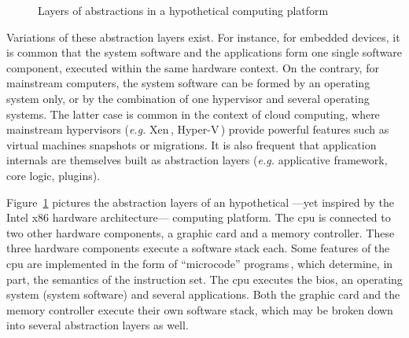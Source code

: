 \begin{figure}

  \caption{Layers of abstractions in a hypothetical computing platform}
  \label{fig:intro:layers}
\end{figure}

Variations of these abstraction layers exist.
%
For instance, for embedded devices, it is common that the system software and
the applications form one single software component, executed within the same
hardware context.
%
On the contrary, for mainstream computers, the system software can be formed by
an operating system only, or by the combination of one hypervisor and several
operating systems.
%
The latter case is common in the context of cloud computing, where mainstream
hypervisors (\emph{e.g.} Xen\,\cite{barham2003xen},
Hyper-V\,\cite{velte2009hyperv}) provide powerful features such as virtual
machines snapshots or migrations.
%
It is also frequent that application internals are themselves built as
abstraction layers (\emph{e.g.} applicative framework, core logic, plugins).

Figure~\ref{fig:intro:layers} pictures the abstraction layers of an hypothetical
---yet inspired by the Intel x86 hardware architecture--- computing platform.
%
The \ac{cpu} is connected to two other hardware components, a graphic card and a
memory controller.
%
These three hardware components execute a software stack each.
%
Some features of the \ac{cpu} are implemented in the form of ``microcode''
programs\,\cite{chen2014microcode}, which determine, in part, the semantics of
the instruction set.
%
The \ac{cpu} executes the \ac{bios}, an operating system (system software) and
several applications.
%
Both the graphic card and the memory controller execute their own software
stack, which may be broken down into several abstraction layers as well.

